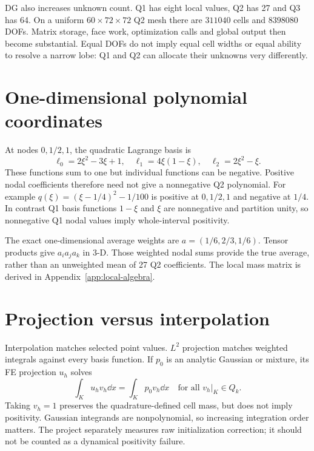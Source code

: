 DG also increases unknown count. Q1 has eight local values, Q2 has 27 and Q3 has 64. On a uniform $60\times72\times72$ Q2 mesh there are $311040$ cells and $8398080$ DOFs. Matrix storage, face work, optimization calls and global output then become substantial. Equal DOFs do not imply equal cell widths or equal ability to resolve a narrow lobe: Q1 and Q2 can allocate their unknowns very differently.

\section{One-dimensional polynomial coordinates}
At nodes $0,1/2,1$, the quadratic Lagrange basis is
\begin{equation}
\ell_0=2\xi^2-3\xi+1,\quad \ell_1=4\xi(1-\xi),\quad \ell_2=2\xi^2-\xi.
\end{equation}
These functions sum to one but individual functions can be negative. Positive nodal coefficients therefore need not give a nonnegative Q2 polynomial. For example $q(\xi)=(\xi-1/4)^2-1/100$ is positive at $0,1/2,1$ and negative at $1/4$. In contrast Q1 basis functions $1-\xi$ and $\xi$ are nonnegative and partition unity, so nonnegative Q1 nodal values imply whole-interval positivity.

The exact one-dimensional average weights are $a=(1/6,2/3,1/6)$. Tensor products give $a_i a_j a_k$ in 3-D. Those weighted nodal sums provide the true average, rather than an unweighted mean of 27 Q2 coefficients. The local mass matrix is derived in Appendix~\ref{app:local-algebra}.

\section{Projection versus interpolation}
Interpolation matches selected point values. $L^2$ projection matches weighted integrals against every basis function. If $p_0$ is an analytic Gaussian or mixture, its FE projection $u_h$ solves
\begin{equation}\label{eq:l2projection}
\int_Ku_hv_h\dd x=\int_Kp_0v_h\dd x\quad\text{for all }v_h|_K\in Q_k.
\end{equation}
Taking $v_h=1$ preserves the quadrature-defined cell mass, but does not imply positivity. Gaussian integrands are nonpolynomial, so increasing integration order matters. The project separately measures raw initialization correction; it should not be counted as a dynamical positivity failure.


